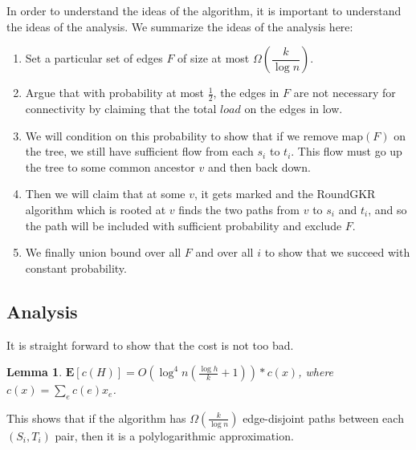 \documentclass[12pt]{article}
\newtheorem{lemma}{Lemma}
\begin{document}
In order to understand the ideas of the algorithm, it is important to understand the ideas of the analysis. We summarize the ideas of the analysis here:
\begin{enumerate}
\item Set a particular set of edges $F$ of size at most $\Omega(\dfrac{k}{\log n})$. 
\item Argue that with probability at most $\frac{1}{2}$, the edges in $F$ are not necessary for connectivity by claiming that the total $load$ on the edges in low. 
\item We will condition on this probability to show that if we remove $\text{map}(F)$ on the tree, we still have sufficient flow from each $s_i$ to $t_i$. This flow must go up the tree to some common ancestor $v$ and then back down.
\item Then we will claim that at some $v$, it gets marked and the RoundGKR algorithm which is rooted at $v$ finds the two paths from $v$ to $s_i$ and $t_i$, and so the path will be included with sufficient probability and exclude $F$.
\item We finally union bound over all $F$ and over all $i$ to show that we succeed with constant probability. 
\end{enumerate}

\subsection{Analysis}

It is straight forward to show that the cost is not too bad.

\begin{lemma}
$\textbf{E}[c(H)] = O(\log^4n(\frac{\log h}{k}+1)) * c(x)$, where $c(x) = \sum_e c(e)x_e$. 
\end{lemma}
This shows that if the algorithm has $\Omega(\frac{k}{\log n})$ edge-disjoint paths between each $(S_i, T_i)$ pair, then it is a polylogarithmic approximation. 
\end{document}
